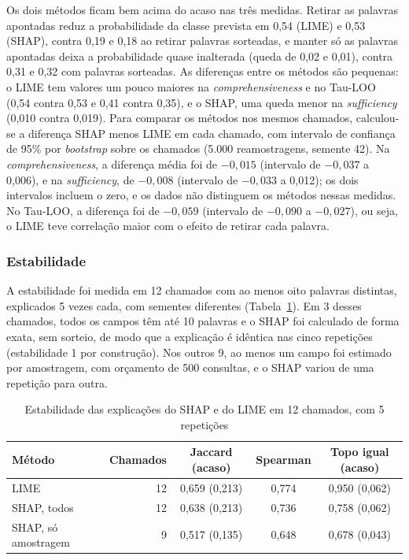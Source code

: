 \documentclass[
    12pt,                %
    openright,           %
    oneside,             %
    a4paper,             %
    english,             %
    brazil               %
]{abntex2}
\begin{document}
Os dois métodos ficam bem acima do acaso nas três medidas. Retirar as palavras apontadas reduz a probabilidade da classe prevista em 0,54 (LIME) e 0,53 (SHAP), contra 0,19 e 0,18 ao retirar palavras sorteadas, e manter só as palavras apontadas deixa a probabilidade quase inalterada (queda de 0,02 e 0,01), contra 0,31 e 0,32 com palavras sorteadas. As diferenças entre os métodos são pequenas: o LIME tem valores um pouco maiores na \textit{comprehensiveness} e no Tau-LOO (0,54 contra 0,53 e 0,41 contra 0,35), e o SHAP, uma queda menor na \textit{sufficiency} (0,010 contra 0,019). Para comparar os métodos nos mesmos chamados, calculou-se a diferença SHAP menos LIME em cada chamado, com intervalo de confiança de 95\% por \textit{bootstrap} sobre os chamados (5.000 reamostragens, semente 42). Na \textit{comprehensiveness}, a diferença média foi de $-0{,}015$ (intervalo de $-0{,}037$ a 0,006), e na \textit{sufficiency}, de $-0{,}008$ (intervalo de $-0{,}033$ a 0,012); os dois intervalos incluem o zero, e os dados não distinguem os métodos nessas medidas. No Tau-LOO, a diferença foi de $-0{,}059$ (intervalo de $-0{,}090$ a $-0{,}027$), ou seja, o LIME teve correlação maior com o efeito de retirar cada palavra.

\subsubsection{Estabilidade}
\label{subsubsec:res_estabilidade}

A estabilidade foi medida em 12 chamados com ao menos oito palavras distintas, explicados 5 vezes cada, com sementes diferentes (Tabela~\ref{tab:res_estabilidade}). Em 3 desses chamados, todos os campos têm até 10 palavras e o SHAP foi calculado de forma exata, sem sorteio, de modo que a explicação é idêntica nas cinco repetições (estabilidade 1 por construção). Nos outros 9, ao menos um campo foi estimado por amostragem, com orçamento de 500 consultas, e o SHAP variou de uma repetição para outra.

\begin{table}[htb]
  \centering
  \caption{Estabilidade das explicações do SHAP e do LIME em 12 chamados, com 5 repetições}
  \label{tab:res_estabilidade}
  \small
  \begin{tabular}{p{3.9cm}rccc}
    \toprule
    Método & Chamados & Jaccard (acaso) & Spearman & Topo igual (acaso) \\
    \midrule
    LIME & 12 & 0,659 (0,213) & 0,774 & 0,950 (0,062) \\
    SHAP, todos & 12 & 0,638 (0,213) & 0,736 & 0,758 (0,062) \\
    SHAP, só amostragem & 9 & 0,517 (0,135) & 0,648 & 0,678 (0,043) \\
    \bottomrule
  \end{tabular}
\end{table}
\end{document}
